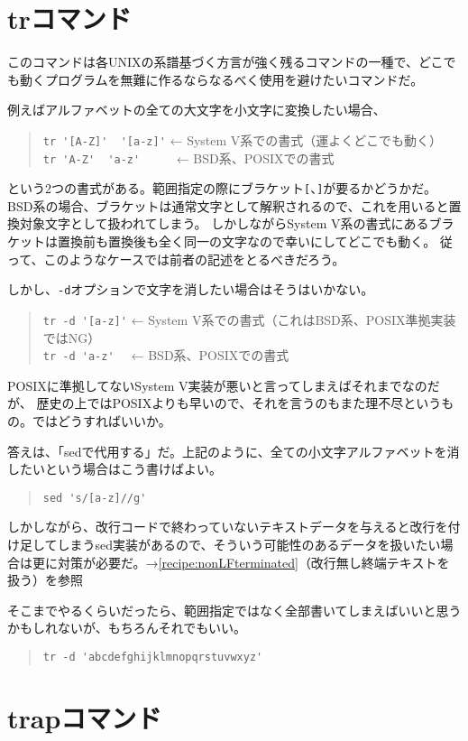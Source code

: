 \section{trコマンド}
\label{allenvs:tr}

このコマンドは各UNIXの系譜基づく方言が強く残るコマンドの一種で、どこでも動くプログラムを無難に作るならなるべく使用を避けたいコマンドだ。

例えばアルファベットの全ての大文字を小文字に変換したい場合、
\begin{quote}
	\verb|tr '[A-Z]'  '[a-z]'| ← System V系での書式（運よくどこでも動く）\\
	\verb|tr 'A-Z'  'a-z'     | ← BSD系、POSIXでの書式
\end{quote}
という2つの書式がある。範囲指定の際にブラケット\verb|[|、\verb|]|が要るかどうかだ。
BSD系の場合、ブラケットは通常文字として解釈されるので、これを用いると置換対象文字として扱われてしまう。
しかしながらSystem V系の書式にあるブラケットは置換前も置換後も全く同一の文字なので幸いにしてどこでも動く。
従って、このようなケースでは前者の記述をとるべきだろう。

しかし、\verb|-d|オプションで文字を消したい場合はそうはいかない。
\begin{quote}
	\verb|tr -d '[a-z]'| ← System V系での書式（これはBSD系、POSIX準拠実装ではNG）\\
	\verb|tr -d 'a-z'  | ← BSD系、POSIXでの書式
\end{quote}

POSIXに準拠してないSystem V実装が悪いと言ってしまえばそれまでなのだが、
歴史の上ではPOSIXよりも早いので、それを言うのもまた理不尽というもの。ではどうすればいいか。

答えは、「sedで代用する」だ。上記のように、全ての小文字アルファベットを消したいという場合はこう書けばよい。
\begin{quote}
	\verb|sed 's/[a-z]//g'|
\end{quote}

しかしながら、改行コードで終わっていないテキストデータを与えると改行を付け足してしまうsed実装があるので、そういう可能性のあるデータを扱いたい場合は更に対策が必要だ。→\ref{recipe:nonLFterminated}（改行無し終端テキストを扱う）を参照

そこまでやるくらいだったら、範囲指定ではなく全部書いてしまえばいいと思うかもしれないが、もちろんそれでもいい。
\begin{quote}
	\verb|tr -d 'abcdefghijklmnopqrstuvwxyz'|
\end{quote}


\section{trapコマンド}
\label{allenvs:trap}

